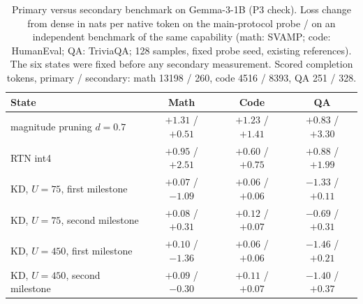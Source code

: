 \begin{table}[H]
\centering\small
\caption{Primary versus secondary benchmark on Gemma-3-1B (P3 check). Loss change from dense in nats per native token on the main-protocol probe / on an independent benchmark of the same capability (math: SVAMP; code: HumanEval; QA: TriviaQA; 128 samples, fixed probe seed, existing references). The six states were fixed before any secondary measurement. Scored completion tokens, primary / secondary: math 13198 / 260, code 4516 / 8393, QA 251 / 328.}
\label{tab:p3_check}
\begin{tabular}{lccc}
\toprule
State & Math & Code & QA \\
\midrule
magnitude pruning $d=0.7$ & $+1.31$ / $+0.51$ & $+1.23$ / $+1.41$ & $+0.83$ / $+3.30$ \\
RTN int4 & $+0.95$ / $+2.51$ & $+0.60$ / $+0.75$ & $+0.88$ / $+1.99$ \\
KD, $U=75$, first milestone & $+0.07$ / $-1.09$ & $+0.06$ / $+0.06$ & $-1.33$ / $+0.11$ \\
KD, $U=75$, second milestone & $+0.08$ / $+0.31$ & $+0.12$ / $+0.07$ & $-0.69$ / $+0.31$ \\
KD, $U=450$, first milestone & $+0.10$ / $-1.36$ & $+0.06$ / $+0.06$ & $-1.46$ / $+0.21$ \\
KD, $U=450$, second milestone & $+0.09$ / $-0.30$ & $+0.11$ / $+0.07$ & $-1.40$ / $+0.37$ \\
\bottomrule
\end{tabular}
\end{table}
